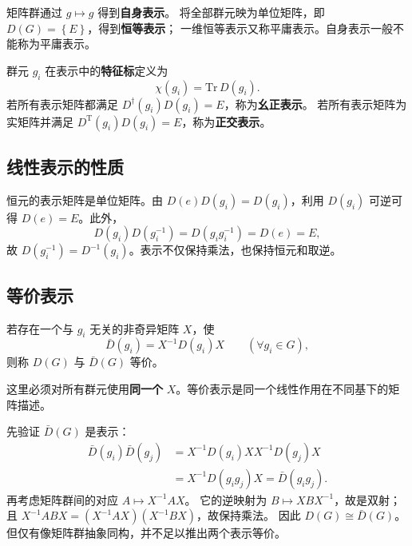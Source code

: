 矩阵群通过 $g\mapsto g$ 得到\textbf{自身表示}。
将全部群元映为单位矩阵，即 $D\left(G\right)=\left\{E\right\}$，得到\textbf{恒等表示}；
一维恒等表示又称平庸表示。自身表示一般不能称为平庸表示。

群元 $g_i$ 在表示中的\textbf{特征标}定义为
\begin{equation}
\chi\left(g_i\right)=\mathrm{Tr}\,D\left(g_i\right).
\end{equation}
若所有表示矩阵都满足 $D^\dagger\left(g_i\right)D\left(g_i\right)=E$，称为\textbf{幺正表示}。
若所有表示矩阵为实矩阵并满足 $D^{\mathrm{T}}\left(g_i\right)D\left(g_i\right)=E$，称为\textbf{正交表示}。

\subsection{线性表示的性质}
恒元的表示矩阵是单位矩阵。由 $D\left(e\right)D\left(g_i\right)=D\left(g_i\right)$，利用 $D\left(g_i\right)$ 可逆可得
$D\left(e\right)=E$。此外，
\begin{equation}
D\left(g_i\right)D\left(g_i^{-1}\right)=D\left(g_ig_i^{-1}\right)=D\left(e\right)=E,
\end{equation}
故 $D\left(g_i^{-1}\right)=D^{-1}\left(g_i\right)$。表示不仅保持乘法，也保持恒元和取逆。

\subsection{等价表示}
\begin{definition}[等价表示]
若存在一个与 $g_i$ 无关的非奇异矩阵 $X$，使
\begin{equation}
\bar D\left(g_i\right)=X^{-1}D\left(g_i\right)X\qquad\left(\forall g_i\in G\right),
\end{equation}
则称 $D\left(G\right)$ 与 $\bar D\left(G\right)$ 等价。
\end{definition}
这里必须对所有群元使用\textbf{同一个} $X$。等价表示是同一个线性作用在不同基下的矩阵描述。

先验证 $\bar D\left(G\right)$ 是表示：
\begin{align}
\bar D\left(g_i\right)\bar D\left(g_j\right)
&=X^{-1}D\left(g_i\right)XX^{-1}D\left(g_j\right)X\\
&=X^{-1}D\left(g_ig_j\right)X=\bar D\left(g_ig_j\right).
\end{align}
再考虑矩阵群间的对应 $A\mapsto X^{-1}AX$。
它的逆映射为 $B\mapsto XBX^{-1}$，故是双射；
且 $X^{-1}ABX=\left(X^{-1}AX\right)\left(X^{-1}BX\right)$，故保持乘法。
因此 $D\left(G\right)\cong\bar D\left(G\right)$。但仅有像矩阵群抽象同构，并不足以推出两个表示等价。

